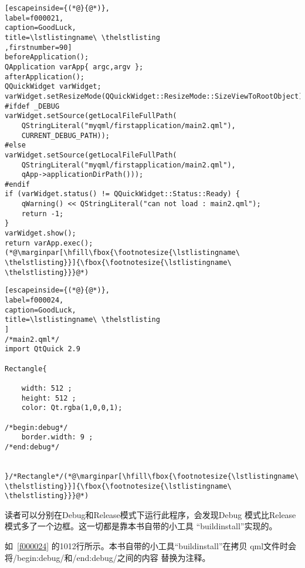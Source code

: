\FloatBarrier
\begin{lstlisting}[escapeinside={(*@}{@*)},
label=f000021,
caption=GoodLuck,
title=\lstlistingname\ \thelstlisting
,firstnumber=90]
beforeApplication();
QApplication varApp{ argc,argv };
afterApplication();
QQuickWidget varWidget;
varWidget.setResizeMode(QQuickWidget::ResizeMode::SizeViewToRootObject);
#ifdef _DEBUG
varWidget.setSource(getLocalFileFullPath(
    QStringLiteral("myqml/firstapplication/main2.qml"),
    CURRENT_DEBUG_PATH));
#else
varWidget.setSource(getLocalFileFullPath(
    QStringLiteral("myqml/firstapplication/main2.qml"),
    qApp->applicationDirPath()));
#endif
if (varWidget.status() != QQuickWidget::Status::Ready) {
    qWarning() << QStringLiteral("can not load : main2.qml");
    return -1;
}
varWidget.show();
return varApp.exec();(*@\marginpar[\hfill\fbox{\footnotesize{\lstlistingname\ \thelstlisting}}]{\fbox{\footnotesize{\lstlistingname\ \thelstlisting}}}@*)\end{lstlisting}          %
\FloatBarrier
\begin{lstlisting}[escapeinside={(*@}{@*)},
label=f000024,
caption=GoodLuck,
title=\lstlistingname\ \thelstlisting
]
/*main2.qml*/
import QtQuick 2.9

Rectangle{

    width: 512 ;
    height: 512 ;
    color: Qt.rgba(1,0,0,1);

/*begin:debug*/
    border.width: 9 ;
/*end:debug*/


}/*Rectangle*/(*@\marginpar[\hfill\fbox{\footnotesize{\lstlistingname\ \thelstlisting}}]{\fbox{\footnotesize{\lstlistingname\ \thelstlisting}}}@*)\end{lstlisting}          %

读者可以分别在Debug和Release模式下运行此程序，会发现Debug
模式比Release模式多了一个边框。这一切都是靠本书自带的小工具
“build\underline{\hspace{0.5em}}install”实现的。

如\lstlistingname\ \ref{f000024}
的10\raisebox{0.16ex}{\sourcefonttwo\~{}}12行所示。本书自带的小工具“build\underline{\hspace{0.5em}}install”在拷贝
qml文件时会将/\raisebox{-0.35ex}{\sourcefonttwo{}*}begin:debug\raisebox{-0.35ex}{\sourcefonttwo{}*}/和/\raisebox{-0.35ex}{\sourcefonttwo{}*}end:debug\raisebox{-0.35ex}{\sourcefonttwo{}*}/之间的内容
替换为注释。

